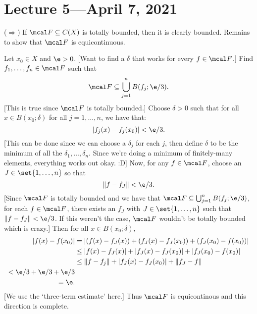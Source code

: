 \documentclass[class=article, crop=false]{standalone}
\begin{document}
\section{Lecture 5---April 7, 2021}

\begin{pf}
  ($\Rightarrow$) If $\mcal F \subseteq C(X)$ is totally bounded, then it is clearly bounded. Remains to show that $\mcal F$ is equicontinuous.

  Let $x_0 \in X$ and $\e > 0$. [Want to find a $\delta$ that works for every $f \in \mcal F$.] Find $f_1,\ldots,f_n \in \mcal F$ such that
    \[
      \mcal F \subseteq \bigcup_{j=1}^{n} B(f_j;\e/3).
    \]
  [This is true since $\mcal F$ is totally bounded.] Choose $\delta > 0$ such that for all $x \in B(x_0 ; \delta)$ for all $j=1,\ldots,n$, we have that:
    \[
      |f_j(x)-f_j(x_0)| < \e/3.
    \]
  [This can be done since we can choose a $\delta_j$ for each $j$, then define $\delta$ to be the minimum of all the $\delta_1, \ldots, \delta_n$. Since we're doing a minimum of finitely-many elements, everything works out okay. :D] Now, for any $f \in \mcal F$, choose an $J \in \set{1,\ldots,n}$ so that
    \[
      \|f-f_J\| < \e/3.
    \]
  [Since $\mcal F$ is totally bounded and we have that $\mcal F \subseteq \bigcup_{j=1}^{n} B(f_j;\e/3)$, for each $f \in \mcal F$, there exists an $f_J$ with $J \in \set{1,\ldots,n}$ such that $\|f-f_J\| < \e/3$. If this weren't the case, $\mcal F$ wouldn't be totally bounded which is crazy.] Then for all $x \in B(x_0;\delta)$,
    \begin{align*}
      |f(x)-f(x_0)| &= |(f(x)-f_J(x))+(f_J(x)-f_J(x_0))+(f_J(x_0)-f(x_0))| \\
      &\leq |f(x)-f_J(x)| + |f_J(x)-f_J(x_0)| + |f_J(x_0)-f(x_0)|\\
      &\leq \|f-f_j\| + |f_J(x)-f_J(x_0)| + \|f_J-f\| \\
      < \e/3 + \e/3 + \e/3 \\
      = \e.
    \end{align*}
  [We use the `three-term estimate' here.] Thus $\mcal F$ is equicontinous and this direction is complete.


\end{pf}
\end{document}
